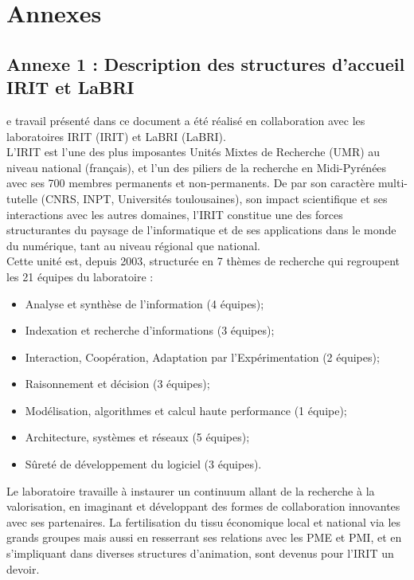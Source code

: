 %
%

\chapter*{Annexes}
\label{chap:annex}

\section*{Annexe 1 : Description des structures d'accueil IRIT et LaBRI}
e travail présenté dans ce document a été réalisé en collaboration avec les laboratoires \acs{IRIT} (\acl{IRIT}) et \acs{LaBRI} (\acl{LaBRI}).\\
L'IRIT est l'une des plus imposantes Unités Mixtes de Recherche (UMR) au niveau national (français), et l’un des piliers de la recherche en Midi-Pyrénées avec ses 700 membres permanents et non-permanents. De par son caractère multi-tutelle (CNRS, \acs{INPT}, Universités toulousaines), son impact scientifique et ses interactions avec les autres domaines, l'IRIT constitue une des forces structurantes du paysage de l’informatique et de ses applications dans le monde du numérique, tant au niveau régional que national.\\
Cette unité est, depuis 2003, structurée en 7 thèmes de recherche qui regroupent les 21 équipes du laboratoire :
\begin{itemize}[label=]
    \item Analyse et synthèse de l’information (4 équipes);
    \item Indexation et recherche d’informations (3 équipes);
    \item Interaction, Coopération, Adaptation par l’Expérimentation (2 équipes);
    \item Raisonnement et décision (3 équipes);
    \item Modélisation, algorithmes et calcul haute performance (1 équipe);
    \item Architecture, systèmes et réseaux (5 équipes);
    \item Sûreté de développement du logiciel (3 équipes).
\end{itemize}

\noindent Le laboratoire travaille à instaurer un continuum allant de la recherche à la valorisation, en imaginant et développant des formes de collaboration innovantes avec ses partenaires. La fertilisation du tissu économique local et national via les grands groupes mais aussi en resserrant ses relations avec les PME et PMI, et en s'impliquant dans diverses structures d’animation, sont devenus pour l’IRIT un devoir.\\

